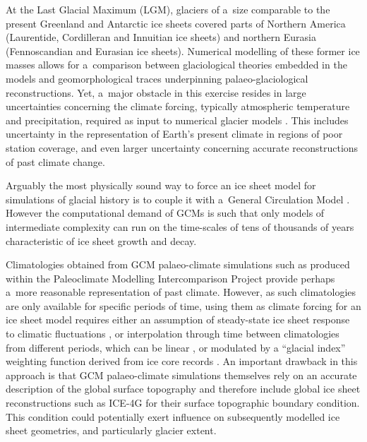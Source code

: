 \documentclass[tc, ms]{copernicus}
\begin{document}
\introduction
\label{sec:intro}

At the Last Glacial Maximum (LGM), glaciers of a~size comparable to the present Greenland and Antarctic ice sheets covered parts of Northern America (Laurentide, Cordilleran and Innuitian ice sheets) and northern Eurasia (Fennoscandian and Eurasian ice sheets). Numerical modelling of these former ice masses allows for a~comparison between glaciological theories embedded in the models and geomorphological traces underpinning palaeo-glaciological reconstructions. Yet, a~major obstacle in this exercise resides in large uncertainties concerning the climate forcing, typically atmospheric temperature and precipitation, required as input to numerical glacier models \citep{hebeler-etal-2008}. This includes uncertainty in the representation of Earth's present climate in regions of poor station coverage, and even larger uncertainty concerning accurate reconstructions of past climate change.

Arguably the most physically sound way to force an ice sheet model for simulations of glacial history is to couple it with a~General Circulation Model \citep[GCM;][]{yoshimori-etal-2001,calov-etal-2002,abeouchi-etal-2007,charbit-etal-2013}. However the computational demand of GCMs is such that only models of intermediate complexity can run on the time-scales of tens of thousands of years characteristic of ice sheet growth and decay.

Climatologies obtained from GCM palaeo-climate simulations such as produced within the Paleoclimate Modelling Intercomparison Project \citep[PMIP;][]{joussaume-taylor-1995} provide perhaps a~more reasonable representation of past climate. However, as such climatologies are only available for specific periods of time, using them as climate forcing for an ice sheet model requires either an assumption of steady-state ice sheet response to climatic fluctuations \citep{huybrechts-tsiobbel-1996}, or interpolation through time between climatologies from different periods, which can be linear \citep{charbit-etal-2002}, or modulated by a ``glacial index'' weighting function derived from ice core  records \citep{marshall-clarke-1999,tarasov-peltier-2004,zweck-huybrechts-2005,gregoire-etal-2012}. An important drawback in this approach is that GCM palaeo-climate simulations themselves rely on an accurate description of the global surface topography and therefore include global ice sheet reconstructions such as ICE-4G \citep{peltier-1994} for their surface topographic boundary condition. This condition could potentially exert influence on subsequently modelled ice sheet geometries, and particularly glacier extent.
\end{document}
